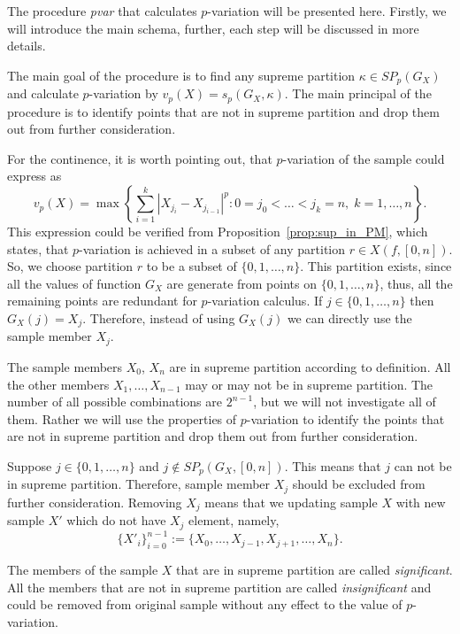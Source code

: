 \documentclass[12pt, a4paper]{article}
\numberwithin{equation}{section}
\begin{document}
The procedure \emph{pvar} that calculates
$p$-variation will be presented here. Firstly,
we will introduce the main schema, further, each step will
be discussed in more details. 

The main goal of the procedure is to find
any supreme partition 
$\kappa \in SP_p(G_X)$ and calculate $p$-variation
by $v_p(X) = s_p(G_X, \kappa)$.
The main principal of the procedure is to identify
points that are not in supreme partition and drop them out from
further consideration.

For the continence, 
it is worth pointing out, that 
$p$-variation of the sample could express as
\begin{equation}
  v_p(X) = \max\left\{ \sum_{i=1}^k |X_{j_i} - X_{j_{i-1}}|^p :
  0=j_0<\dots<j_k=n,\; k=1,\dots,n  \right\}.
\end{equation}
This expression could be verified from
Proposition~\ref{prop:sup_in_PM},
which states, that $p$-variation
is achieved in a subset of any partition $r \in X(f, [0,n])$.
So, we choose partition $r$ to be a subset
of $\{0, 1, \dots, n\}$. This partition exists, 
since all the values of function $G_X$ are
generate from points on $\{0, 1, \dots, n\}$, thus,
all the remaining points are redundant for $p$-variation calculus.
If $j \in \{0, 1, \dots, n\}$ then $G_X(j) = X_j$. Therefore,
instead of using $G_X(j)$ we can directly use
the sample member $X_j$. 

The sample members $X_0$, $X_n$ are in supreme partition according to
definition. All the other members $X_1, \dots, X_{n-1}$
may or may not be in supreme partition.
The number of all possible combinations are
$2^{n-1}$, but we will not investigate all of them.
Rather we will use the properties of $p$-variation
to identify the points that are not
in supreme partition and drop them out from further consideration.

Suppose $j \in \{0, 1, \dots, n\}$ and
$j \notin SP_p(G_X, [0, n])$. This means that
$j$ can not be in supreme partition. Therefore, 
sample member $X_j$ should be excluded from further consideration.
Removing $X_j$ means that we 
updating sample $X$ with new sample $X'$ which do not have
$X_j$ element, namely,  
$$
\{X'_{i}\}_{i=0}^{n-1}:=\{X_0,\dots,X_{j-1},X_{j+1},\dots,X_n\}.
$$

The members of the sample $X$ that are in supreme partition are
called \emph{significant}. All the members
that are not in supreme partition are called \emph{insignificant} and   could be removed from original sample without any effect to 
the value of $p$-variation.
\end{document}
